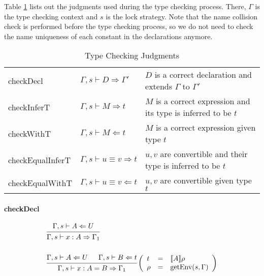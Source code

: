 \documentclass{article}
\theoremstyle{remark}
\begin{document}
Table \ref{tab:judgments} lists out the judgments used during the type checking process. There, $\Gamma$ is the type checking context and $s$ is the lock strategy. Note that the name collision check is performed before the type checking process, so we do not need to check the name uniqueness of each constant in the declarations anymore.
\begin{table}[h]
  \centering
  \begin{tabular}{l l p{2 in}}
    checkDecl   & $\Gamma,s \vdash D \Rightarrow \Gamma'$ & $D$ is a correct declaration and extends $\Gamma$ to $\Gamma'$ \\
    checkInferT & $\Gamma,s \vdash M \Rightarrow t$ & $M$ is a correct expression and its type is inferred to be $t$ \\
    checkWithT  & $\Gamma,s \vdash M \Leftarrow t$ & $M$ is a correct expression given type $t$ \\
    checkEqualInferT & $\Gamma,s \vdash u \equiv v \Rightarrow t $ & $u, v$ are convertible and their type is inferred to be $t$ \\ 
    checkEqualWithT  & $\Gamma,s \vdash u \equiv v \Leftarrow t  $ & $u, v$ are convertible given type $t$ 
  \end{tabular}
  \caption{Type Checking Judgments}
  \label{tab:judgments}
\end{table}

\paragraph{checkDecl}
\begin{align}
  &\begin{prooftree}
    \hypo{\Gamma,s \vdash A \Leftarrow U}
    \infer1{\Gamma,s \vdash x : A \Rightarrow \Gamma_1}
  \end{prooftree} \\
  \nonumber \\
  &\begin{prooftree}
    \hypo{\Gamma,s \vdash A \Leftarrow U}
    \hypo{\Gamma,s \vdash B \Leftarrow t}
    \infer2{\Gamma,s \vdash x : A = B \Rightarrow \Gamma_1}
  \end{prooftree}\left(\begin{array}{l l l}
                         t & = & \llbracket A \rrbracket \rho \\
                         \rho & = & \text{getEnv}(s, \Gamma)
                       \end{array}\right)
\end{align}
\end{document}
